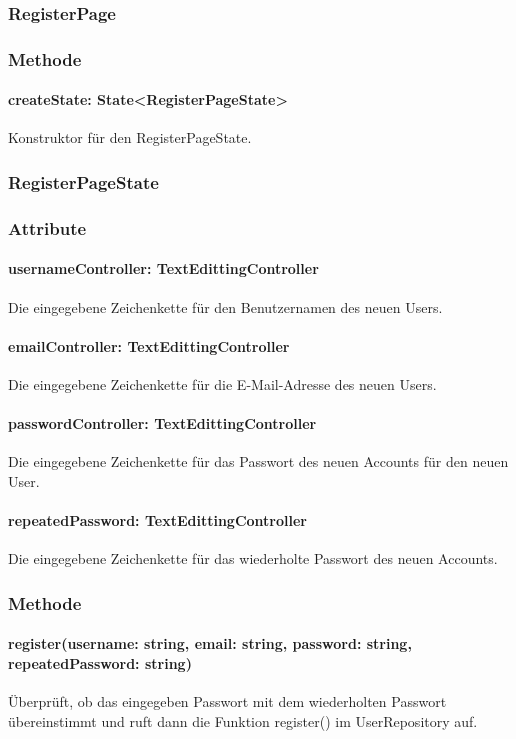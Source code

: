 \documentclass[parskip=full]{scrartcl}
\begin{document}
    \subsubsection{RegisterPage}
        \subsubsection*{Methode}
            \paragraph*{createState: State<RegisterPageState>} Konstruktor für den RegisterPageState.
    
    \subsubsection{RegisterPageState}
        \subsubsection*{Attribute}
            \paragraph*{usernameController: TextEdittingController} Die eingegebene Zeichenkette für den Benutzernamen des neuen Users.
            \paragraph*{emailController: TextEdittingController} Die eingegebene Zeichenkette für die E-Mail-Adresse des neuen Users.
            \paragraph*{passwordController: TextEdittingController} Die eingegebene Zeichenkette für das Passwort des neuen Accounts für den neuen User.
            \paragraph*{repeatedPassword: TextEdittingController} Die eingegebene Zeichenkette für das wiederholte Passwort des neuen Accounts.
         
        \subsubsection*{Methode}
            \paragraph*{register(username: string, email: string, password: string, repeatedPassword: string)} Überprüft, ob das eingegeben Passwort mit dem wiederholten Passwort übereinstimmt und ruft dann die Funktion register() im UserRepository auf.
\end{document}
